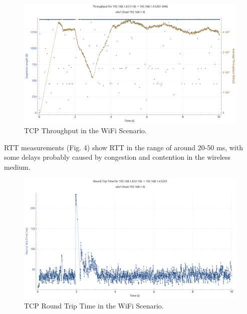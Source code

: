\begin{enumerate}
                \begin{figure}[ht]
                    \centering
                    \includegraphics[width=0.9\columnwidth]{images/graphs/Throughput/Throughput_WiFi_TCP.pdf}
                    \caption{TCP Throughput in the WiFi Scenario. \vspace{0.2cm}} %
                    \label{fig:throughput-wifi-tcp}
                \end{figure}

                RTT measurements (Fig. 4) show RTT in the range of around 20-50 ms, with some delays probably caused by congestion and contention in the wireless medium.
                
                \begin{figure}[ht]
                    \centering
                    \includegraphics[width=0.9\columnwidth]{images/graphs/RTT/RTT_WiFi_TCP.pdf}
                    \caption{TCP Round Trip Time in the WiFi Scenario.}
                    \label{fig:rtt-wifi-tcp}
                \end{figure}    

                

\end{enumerate}
